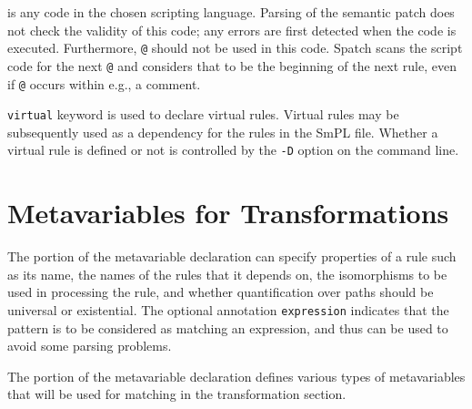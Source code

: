 \noindent
{} is any code in the chosen scripting language.  Parsing of
the semantic patch does not check the validity of this code; any errors are
first detected when the code is executed.  Furthermore, \texttt{@} should
not be used in this code.  Spatch scans the script code for the next
\texttt{@} and considers that to be the beginning of the next rule, even if
\texttt{@} occurs within e.g., a comment.

\texttt{virtual} keyword is used to declare virtual rules. Virtual
rules may be subsequently used as a dependency for the rules in the
SmPL file. Whether a virtual rule is defined or not is controlled by
the \texttt{-D} option on the command line.


\section{Metavariables for Transformations}

The  portion of the metavariable declaration can specify
properties of a rule such as its name, the names of the rules that it
depends on, the isomorphisms to be used in processing the rule, and whether
quantification over paths should be universal or existential.  The optional
annotation {\tt expression} indicates that the pattern is to be considered
as matching an expression, and thus can be used to avoid some parsing
problems.

The  portion of the metavariable declaration defines various
types of metavariables that will be used for matching in the transformation
section.

